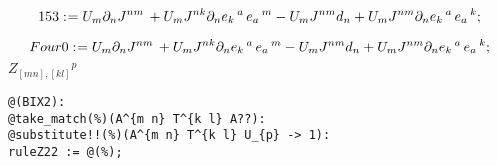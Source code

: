\documentclass[11pt]{article}
\def\specialcolon{\mathrel{\mathop{:}}\hspace{-.5em}}
\begin{document}
\begin{dmath*}[compact, spread=2pt]
153\specialcolon{}= {U}_{m} {\partial}_{n}{{J}^{n m}}\,  + {U}_{m} {J}^{n k} {\partial}_{n}{{e}_{k}\,^{a}}\,  {e}_{a}\,^{m} - {U}_{m} {J}^{n m} {d}_{n} + {U}_{m} {J}^{n m} {\partial}_{n}{{e}_{k}\,^{a}}\,  {e}_{a}\,^{k};
\end{dmath*}


\begin{dmath*}[compact, spread=2pt]
Four0\specialcolon{}= {U}_{m} {\partial}_{n}{{J}^{n m}}\,  + {U}_{m} {J}^{n k} {\partial}_{n}{{e}_{k}\,^{a}}\,  {e}_{a}\,^{m} - {U}_{m} {J}^{n m} {d}_{n} + {U}_{m} {J}^{n m} {\partial}_{n}{{e}_{k}\,^{a}}\,  {e}_{a}\,^{k};
\end{dmath*}
$Z_{[mn],[kl]}{}^p$
{\color[named]{Blue}\begin{verbatim}
@(BIX2):
@take_match(%)(A^{m n} T^{k l} A??):
@substitute!!(%)(A^{m n} T^{k l} U_{p} -> 1):
ruleZ22 := @(%);
\end{verbatim}}
\end{document}
